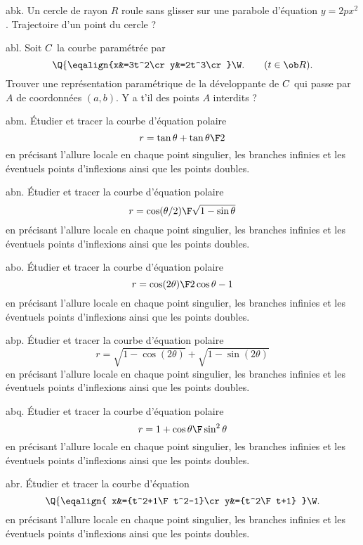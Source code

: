 \exo [Level=2,Fight=2,Learn=1,Field=\Roulement,Type=\Exercices,Origin=] abk. 
Un cercle de rayon $R$ roule sans glisser sur 
une parabole d'équation $y=2px^2$. 
Trajectoire d'un point du cercle ?

\exo [Level=2,Fight=1,Learn=1,Field=\Développantes,Type=\Exercices,Origin=] abl. 
Soit $\sc C$ la courbe paramétrée par $$
\Q\{\eqalign{x&=3t^2\cr y&=2t^3\cr}\W.\qquad(t\in\ob R).
$$
Trouver une représentation paramétrique de la développante de $\sc C$ 
qui passe par $A$ de coordonnées $(a,b)$. Y a t'il des points $A$ interdits ?

\exo [Level=1,Fight=1,Learn=2,Field=\CourbesParamétréesPolaires,Type=\Exercices,Origin=] abm. 
\'Etudier et tracer la courbe d'équation polaire 
$$
r=\tan\theta+\tan{\theta\F2}
$$ 
en précisant l'allure  locale en chaque point singulier, les branches infinies 
et les éventuels points d'inflexions ainsi que les points doubles. 

\exo [Level=1,Fight=1,Learn=2,Field=\CourbesParamétréesPolaires,Type=\Exercices,Origin=] abn. 
\'Etudier et tracer la courbe d'équation polaire 
$$
r={\cos(\theta/2)\F\sqrt{1-\sin\theta}}
$$ 
en précisant l'allure  locale en chaque point singulier, les branches infinies 
et les éventuels points d'inflexions ainsi que les points doubles. 

\exo [Level=1,Fight=1,Learn=2,Field=\CourbesParamétréesPolaires,Type=\Exercices,Origin=] abo. 
\'Etudier et tracer la courbe d'équation polaire 
$$
r={\cos(2\theta)\F2\cos\theta-1}
$$ 
en précisant l'allure  locale en chaque point singulier, les branches infinies 
et les éventuels points d'inflexions ainsi que les points doubles. 

\exo [Level=1,Fight=1,Learn=2,Field=\CourbesParamétréesPolaires,Type=\Exercices,Origin=] abp. 
\'Etudier et tracer la courbe d'équation polaire 
$$
r=\sqrt{1-\cos(2\theta)}+\sqrt{1-\sin(2\theta)}
$$ 
en précisant l'allure  locale en chaque point singulier, les branches infinies 
et les éventuels points d'inflexions ainsi que les points doubles. 

\exo [Level=1,Fight=1,Learn=2,Field=\CourbesParamétréesPolaires,Type=\Exercices,Origin=] abq. 
\'Etudier et tracer la courbe d'équation polaire 
$$
r={1+\cos\theta\F\sin^2\theta}
$$ 
en précisant l'allure  locale en chaque point singulier, les branches infinies 
et les éventuels points d'inflexions ainsi que les points doubles. 


\exo [Level=1,Fight=0,Learn=1,Field=\CourbesParamétréesCartésiennes,Type=\Exercices,Origin=] abr. 
\'Etudier et tracer la courbe d'équation 
$$
\Q\{\eqalign{
x&={t^2+1\F t^2-1}\cr
y&={t^2\F t+1}
}\W.
$$ 
en précisant l'allure  locale en chaque point singulier, les branches infinies 
et les éventuels points d'inflexions ainsi que les points doubles. 


